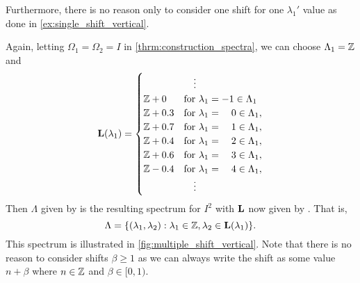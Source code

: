 \documentclass[../thesis.tex]{subfiles}
\begin{document}
Furthermore, there is no reason only to consider one shift for one $\lambda_1'$ value as done in \cref{ex:single_shift_vertical}. 
\begin{example}\label{ex:multiple_shift_vertical}
    Again, letting $\Omega_1=\Omega_2 = I$ in \cref{thrm:construction_spectra}, we can choose $\Lambda_1 = \mathbb{Z}$ and 
    \begin{align}\label{eq:multiple_shift_vertical}
        \mathbf{L}(\lambda_1) = \begin{cases}
            & \text{ \space \space }\vdots\\        
            \mathbb{Z}+0 & \text{for } \lambda_1 = -1 \in \Lambda_1\\
            \mathbb{Z}+0.3 & \text{for } \lambda_1 = \text{\space\space\space} 0 \in \Lambda_1,\\
            \mathbb{Z}+0.7 & \text{for } \lambda_1 = \text{\space\space\space} 1 \in \Lambda_1,\\
            \mathbb{Z}+0.4 & \text{for } \lambda_1 = \text{\space\space\space} 2 \in \Lambda_1,\\
            \mathbb{Z}+0.6 & \text{for } \lambda_1 = \text{\space\space\space} 3 \in \Lambda_1,\\
            \mathbb{Z}-0.4 & \text{for } \lambda_1 = \text{\space\space\space} 4 \in \Lambda_1,\\
            & \text{ \space \space }\vdots
        \end{cases}
    \end{align}
    Then $\Lambda$ given by  is the resulting spectrum for $I^2$ with $\mathbf{L}$ now given by . That is,
    \begin{equation*}
        \Lambda = \{(\lambda_1, \lambda_2): \lambda_1\in \mathbb{Z}, \lambda_2 \in \mathbf{L}(\lambda_1)\}.
    \end{equation*}
    This spectrum is illustrated in \cref{fig:multiple_shift_vertical}. Note that there is no reason to consider shifts $\beta \geq 1$ as we can always write the shift as some value $n+\beta$ where $n\in \mathbb{Z}$ and $\beta \in [0,1)$.
\end{example}
\end{document}
